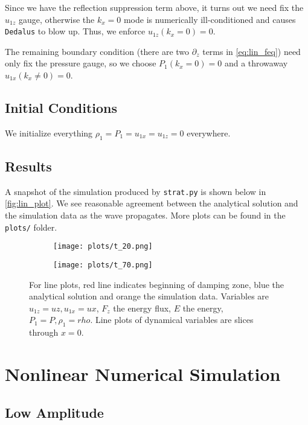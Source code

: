 \documentclass[11pt,
        usenames, %
        dvipsnames %
    ]{article}
\begin{document}
Since we have the reflection suppression term above, it turns out we need fix
the $u_{1z}$ gauge, otherwise the $k_x = 0$ mode is numerically ill-conditioned
and causes \texttt{Dedalus} to blow up. Thus, we enforce $u_{1z}(k_x = 0) = 0$.

The remaining boundary condition (there are two $\partial_z$ terms in
\autoref{eq:lin_feq}) need only fix the pressure gauge, so we choose $P_1(k_x =
0) = 0$ and a throwaway $u_{1x}(k_x \neq 0) = 0$.

\subsection{Initial Conditions}

We initialize everything $\rho_1 = P_1 = u_{1x} = u_{1z} = 0$ everywhere.

\subsection{Results}

A snapshot of the simulation produced by \texttt{strat.py} is shown below in
\autoref{fig:lin_plot}. We see reasonable agreement between the analytical
solution and the simulation data as the wave propagates. More plots can be found
in the \texttt{plots/} folder.
\begin{figure}[t]
    \centering
    \begin{subfigure}{0.75\textwidth}
        \centering
        \texttt{[image: plots/t\_20.png]}
    \end{subfigure}
    \begin{subfigure}{0.75\textwidth}
        \centering
        \texttt{[image: plots/t\_70.png]}
    \end{subfigure}
    \caption{For line plots, red line indicates beginning of damping zone, blue
    the analytical solution and orange the simulation data. Variables are
    $u_{1z} = uz, u_{1x} = ux$, $F_z$ the energy flux, $E$ the energy, $P_1 = P,
    \rho_1 = rho$. Line plots of dynamical variables are slices through $x = 0$.
    }\label{fig:lin_plot}
\end{figure}

\section{Nonlinear Numerical Simulation}

\subsection{Low Amplitude}
\end{document}
